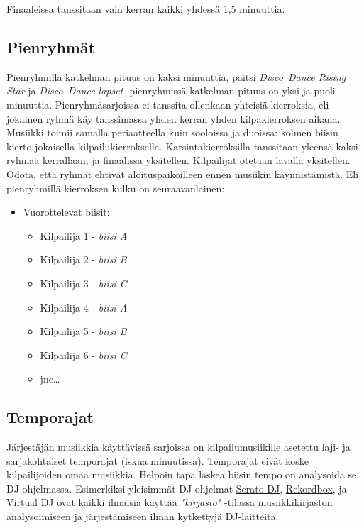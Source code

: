 \documentclass[12pt, a4paper, oneside]{article}
\begin{document}
Finaaleissa tanssitaan vain kerran kaikki yhdessä 1,5 minuuttia.

\subsection{Pienryhmät} \label{subsec:pienryhmat}

Pienryhmillä katkelman pituus on kaksi minuuttia,
paitsi \textit{Disco~Dance Rising Star} ja \textit{Disco~Dance lapset} -pienryhmissä katkelman pituus on yksi ja puoli minuuttia.
Pienryhmäsarjoissa ei tanssita ollenkaan yhteisiä kierroksia,
eli jokainen ryhmä käy tanssimassa yhden kerran yhden kilpakierroksen aikana.
Musiikki toimii samalla periaatteella kuin sooloissa ja duoissa: kolmen biisin kierto jokaisella kilpailukierroksella.
Karsintakierroksilla tanssitaan yleensä kaksi ryhmää kerrallaan,
ja finaalissa yksitellen.
Kilpailijat otetaan lavalla yksitellen.
Odota, että ryhmät ehtivät aloituspaikoilleen ennen musiikin käynnistämistä.
Eli pienryhmillä kierroksen kulku on seuraavanlainen:

\begin{itemize}[nosep]
    \item Vuorottelevat biisit:
        \begin{itemize}
            \item Kilpailija 1 - \textit{biisi A}
            \item Kilpailija 2 - \textit{biisi B}
            \item Kilpailija 3 - \textit{biisi C}
            \item Kilpailija 4 - \textit{biisi A}
            \item Kilpailija 5 - \textit{biisi B}
            \item Kilpailija 6 - \textit{biisi C}
            \item jne\ldots
        \end{itemize}
\end{itemize}

\subsection{Temporajat} \label{subsec:temporajat}

Järjestäjän musiikkia käyttävissä sarjoissa on kilpailumusiikille asetettu laji- ja sarjakohtaiset temporajat (iskua minuutissa).
Temporajat eivät koske kilpailijoiden omaa musiikkia.
Helpoin tapa laskea biisin tempo on analysoida se DJ-ohjelmassa.
Esimerkiksi yleisimmät DJ-ohjelmat \href{https://serato.com/dj}{Serato DJ},
\href{https://rekordbox.com/}{Rekordbox},
ja \href{https://www.virtualdj.com/}{Virtual DJ}
ovat kaikki ilmaisia käyttää \textit{"kirjasto"} -tilassa musiikkikirjaston analysoimiseen ja järjestämiseen ilman kytkettyjä DJ-laitteita.
\end{document}
